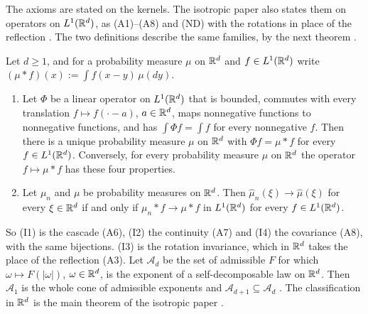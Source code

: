 The axioms are stated on the kernels. The isotropic paper also states them on operators on
$L^1(\mathbb{R}^d)$, as (A1)--(A8) and (ND) with the rotations in place of the reflection
. The two definitions describe the same families, by the
next theorem .

\begin{theorem}
\label{thm:cited-A30}

Let $d \ge 1$, and for a probability measure $\mu$ on $\mathbb{R}^d$ and $f \in L^1(\mathbb{R}^d)$ write
$(\mu * f)(x) := \int f(x - y)\,\mu(dy)$.
\begin{enumerate}
\item Let $\Phi$ be a linear operator on $L^1(\mathbb{R}^d)$ that is bounded, commutes with every
translation $f \mapsto f(\cdot - a)$, $a \in \mathbb{R}^d$, maps nonnegative functions to nonnegative
functions, and has $\int\Phi f = \int f$ for every nonnegative $f$. Then there is a unique
probability measure $\mu$ on $\mathbb{R}^d$ with $\Phi f = \mu * f$ for every $f \in L^1(\mathbb{R}^d)$.
Conversely, for every probability measure $\mu$ on $\mathbb{R}^d$ the operator $f \mapsto \mu * f$ has
these four properties.
\item Let $\mu_n$ and $\mu$ be probability measures on $\mathbb{R}^d$. Then
$\widehat\mu_n(\xi) \to \widehat\mu(\xi)$ for every $\xi \in \mathbb{R}^d$ if and only if
$\mu_n * f \to \mu * f$ in $L^1(\mathbb{R}^d)$ for every $f \in L^1(\mathbb{R}^d)$.
\end{enumerate}
\end{theorem}

So (I1) is the cascade (A6), (I2) the continuity (A7) and (I4) the covariance (A8), with the same
bijections. (I3) is the rotation invariance, which in $\mathbb{R}^d$ takes the place of the reflection
(A3). Let $\mathcal{A}_d$ be the set of admissible $F$ for
which $\omega \mapsto F(|\omega|)$, $\omega \in \mathbb{R}^d$, is the exponent of a self-decomposable law
on $\mathbb{R}^d$. Then $\mathcal{A}_1$ is the whole cone of admissible exponents and
$\mathcal{A}_{d+1} \subseteq \mathcal{A}_d$ . The classification
in $\mathbb{R}^d$ is the main theorem of the isotropic paper .

